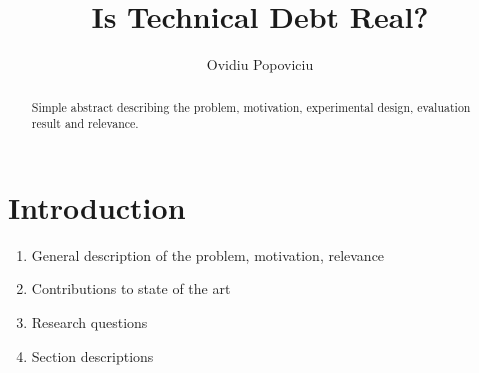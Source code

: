 \documentclass{article}
\begin{document}
\title{Is Technical Debt Real?}
\author{Ovidiu Popoviciu}


\maketitle


\begin{abstract}
Simple abstract describing the problem, motivation, experimental design,
evaluation result and relevance.
\end{abstract}

\section{Introduction}
\label{introduction}

\begin{enumerate}
  \item General description of the problem, motivation, relevance
  \item Contributions to state of the art 
  \item Research questions
  \item Section descriptions
\end{enumerate}


\end{document}

